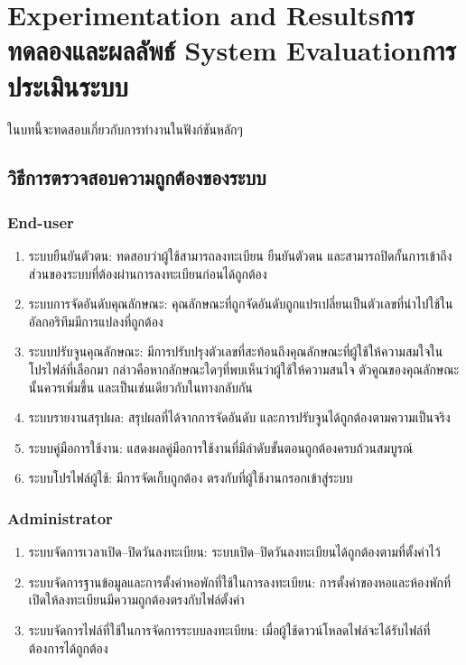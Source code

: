 \chapter{\ifproject%
\ifenglish Experimentation and Results\else การทดลองและผลลัพธ์\fi
\else%
\ifenglish System Evaluation\else การประเมินระบบ\fi
\fi}

ในบทนี้จะทดสอบเกี่ยวกับการทำงานในฟังก์ชันหลักๆ

\section{วิธีการตรวจสอบความถูกต้องของระบบ}
\subsection{End-user}
\begin{enumerate}
    \item ระบบยืนยันตัวตน: ทดสอบว่าผู้ใช้สามารถลงทะเบียน ยืนยันตัวตน และสามารถปิดกั้นการเข้าถึงส่วนของระบบที่ต้องผ่านการลงทะเบียนก่อนได้ถูกต้อง
    \item ระบบการจัดอันดับคุณลักษณะ: คุณลักษณะที่ถูกจัดอันดับถูกแปรเปลี่ยนเป็นตัวเลขที่นำไปใช้ในอัลกอริทึมมีการแปลงที่ถูกต้อง
    \item ระบบปรับจูนคุณลักษณะ: มีการปรับปรุงตัวเลขที่สะท้อนถึงคุณลักษณะที่ผู้ใช้ให้ความสมใจในโปรไฟล์ที่เลือกมา
            กล่าวคือหากลักษณะใดๆที่พบเห็นว่าผู้ใช้ให้ความสนใจ ตัวคูณของคุณลักษณะนั้นควรเพิ่มขึ้น และเป็นเช่นเดียวกับในทางกลับกัน
    \item ระบบรายงานสรุปผล: สรุปผลที่ได้จากการจัดอันดับ และการปรับจูนได้ถูกต้องตามความเป็นจริง
    \item ระบบคู่มือการใช้งาน: แสดงผลคู่มือการใช้งานที่มีลำดับขั้นตอนถูกต้องครบถ้วนสมบูรณ์
    \item ระบบโปรไฟล์ผู้ใช้: มีการจัดเก็บถูกต้อง ตรงกับที่ผู้ใช้งานกรอกเข้าสู่ระบบ
\end{enumerate}

\subsection{Administrator}
\begin{enumerate}
    \item ระบบจัดการเวลาเปิด--ปิดวันลงทะเบียน: ระบบเปิด--ปิดวันลงทะเบียนได้ถูกต้องตามที่ตั้งค่าไว้
    \item ระบบจัดการฐานข้อมูลและการตั้งค่าหอพักที่ใช้ในการลงทะเบียน: การตั้งค่าของหอและห้องพักที่เปิดให้ลงทะเบียนมีความถูกต้องตรงกับไฟล์ตั้งค่า
    \item ระบบจัดการไฟล์ที่ใช้ในการจัดการระบบลงทะเบียน: เมื่อผู้ใช้ดาวน์โหลดไฟล์จะได้รับไฟล์ที่ต้องการได้ถูกต้อง
\end{enumerate}

